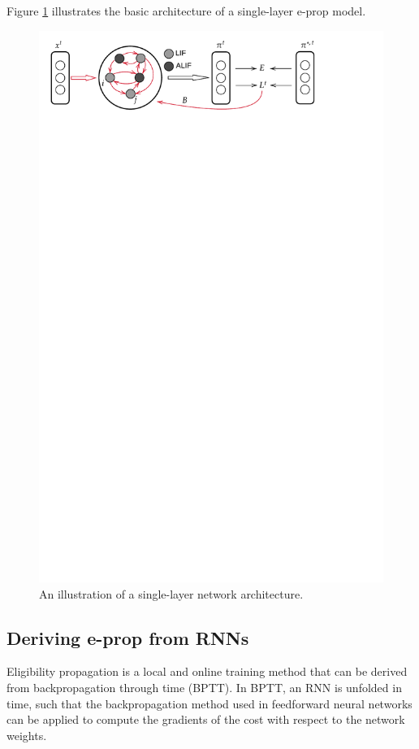         Figure \ref{fig:topology-sl} illustrates the basic architecture of a single-layer e-prop model.
        \begin{figure}[!ht]
            \myfloatalign
            \includegraphics[trim=0 25cm 0 0, clip, width=\linewidth]{gfx/Singlelayer}
            \caption[Multi-layer illustration.]{An illustration of a single-layer network architecture.}
            \label{fig:topology-sl}
          \end{figure}


    \subsection{Deriving e-prop from RNNs}\label{sec:derivefromBPTT}
        Eligibility propagation is a local and online training method that can be derived from backpropagation through time (BPTT).
        In BPTT, an RNN is unfolded in time, such that the backpropagation method used in feedforward neural networks can be applied to compute the gradients of the cost with respect to the network weights.

